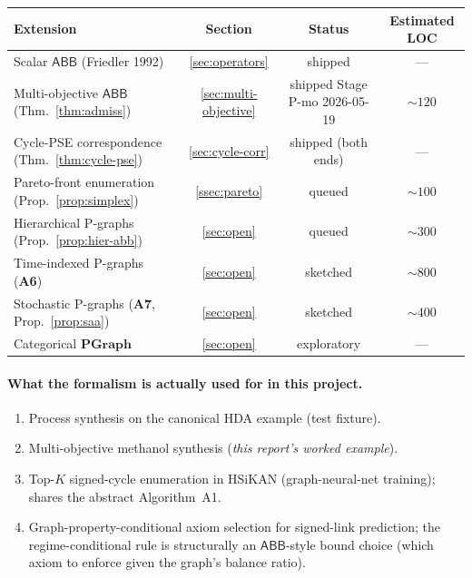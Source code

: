 \documentclass[11pt,a4paper]{article}
\theoremstyle{plain}
\theoremstyle{definition}
\newcommand{\axiomref}[1]{\textbf{A#1}}
\newcommand{\abb}{\textsf{ABB}}
\begin{document}
\begin{center}\small
\begin{tabular}{lccc}
\toprule
Extension & Section & Status & Estimated LOC \\
\midrule
Scalar $\abb$ (Friedler 1992) & \ref{sec:operators} & shipped & --- \\
Multi-objective $\abb$ (Thm.~\ref{thm:admiss})       & \ref{sec:multi-objective} & shipped Stage P-mo 2026-05-19 & $\sim 120$ \\
Cycle-PSE correspondence (Thm.~\ref{thm:cycle-pse})  & \ref{sec:cycle-corr}      & shipped (both ends) & --- \\
Pareto-front enumeration (Prop.~\ref{prop:simplex})  & \ref{ssec:pareto}         & queued & $\sim 100$ \\
Hierarchical P-graphs (Prop.~\ref{prop:hier-abb})    & \ref{sec:open}            & queued & $\sim 300$ \\
Time-indexed P-graphs (\axiomref{6})                 & \ref{sec:open}            & sketched & $\sim 800$ \\
Stochastic P-graphs (\axiomref{7}, Prop.~\ref{prop:saa}) & \ref{sec:open}        & sketched & $\sim 400$ \\
Categorical $\mathbf{PGraph}$                        & \ref{sec:open}            & exploratory & --- \\
\bottomrule
\end{tabular}
\end{center}

\paragraph{What the formalism is actually used for in this project.}
\begin{enumerate}
\item Process synthesis on the canonical HDA example (test fixture).
\item Multi-objective methanol synthesis (\emph{this report's worked example}).
\item Top-$K$ signed-cycle enumeration in HSiKAN (graph-neural-net
      training); shares the abstract Algorithm~A1.
\item Graph-property-conditional axiom selection for signed-link
      prediction; the regime-conditional rule is structurally an
      $\abb$-style bound choice (which axiom to enforce given the
      graph's balance ratio).
\end{enumerate}

\end{document}
